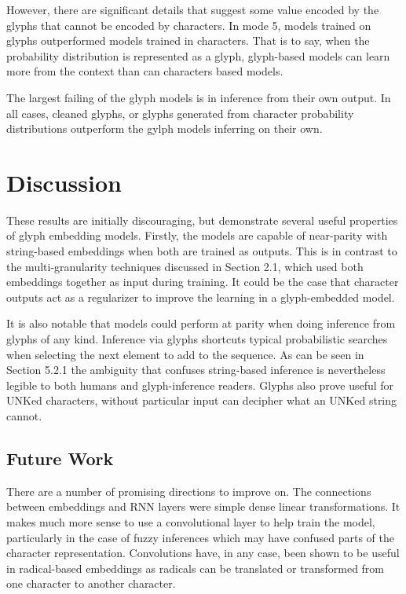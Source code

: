 \documentclass{article}
\begin{document}
However, there are significant details that suggest some value encoded by the glyphs that cannot be encoded by characters. In mode 5, models trained on glyphs outperformed models trained in characters. That is to say, when the probability distribution is represented as a glyph, glyph-based models can learn more from the context than can characters based models.

The largest failing of the glyph models is in inference from their own output. In all cases, cleaned glyphs, or glyphs generated from character probability distributions outperform the gylph models inferring on their own. 

\section{Discussion}

These results are initially discouraging, but demonstrate several useful properties of glyph embedding models. Firstly, the models are capable of near-parity with string-based embeddings when both are trained as outputs. This is in contrast to the multi-granularity techniques discussed in Section 2.1, which used both embeddings together as input during training. It could be the case that character outputs act as a regularizer to improve the learning in a glyph-embedded model. 

It is also notable that models could perform at parity when doing inference from glyphs of any kind. Inference via glyphs shortcuts typical probabilistic searches when selecting the next element to add to the sequence. As can be seen in Section 5.2.1 the ambiguity that confuses string-based inference is nevertheless legible to both humans and glyph-inference readers. Glyphs also prove useful for UNKed characters, without particular input 
can decipher what an UNKed string cannot.

\subsection{Future Work}
\label{sec:Future Works}

There are a number of promising directions to improve on. The connections between embeddings and RNN layers were simple dense linear transformations. It makes much more sense to use a convolutional layer to help train the model, particularly in the case of fuzzy inferences which may have confused parts of the character representation. Convolutions have, in any case, been shown to be useful in radical-based embeddings as radicals can be translated or transformed from one character to another character. 
\end{document}
